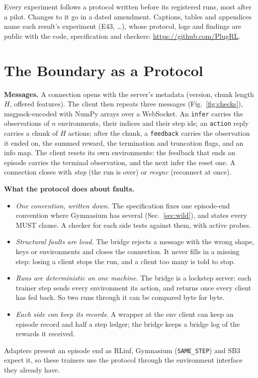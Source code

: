 \documentclass[conference]{IEEEtran}
\newcommand{\msg}[1]{\texttt{#1}}
\begin{document}
Every experiment follows a protocol written before its registered runs,
most after a pilot. Changes to it go in a dated amendment. Captions,
tables and appendices name each result's experiment (E43, \ldots), whose
protocol, logs and findings are public with the code, specification and
checkers: \url{https://github.com/PlugRL}.

\section{The Boundary as a Protocol}
\label{sec:protocol}

\textbf{Messages.} A connection opens with the server's metadata (version,
chunk length $H$, offered features). The client then repeats three messages
(Fig.~\ref{fig:checks}), msgpack-encoded with NumPy arrays over a
WebSocket. An \msg{infer} carries the observations of $n$ environments,
their indices and their step ids; an \msg{action} reply carries a chunk of
$H$ actions; after the chunk, a \msg{feedback} carries the observation it
ended on, the summed reward, the termination and truncation flags, and an
info map. The client resets its own environments: the feedback that ends an
episode carries the terminal observation, and the next infer the reset one.
A connection closes with \emph{stop} (the run is over) or \emph{resync}
(reconnect at once).

\textbf{What the protocol does about faults.}
\begin{itemize}
\item \emph{One convention, written down.} The specification fixes one
  episode-end convention where Gymnasium has several (Sec.~\ref{sec:wild}),
  and states every MUST clause. A checker for each side tests against
  them, with active probes.
\item \emph{Structural faults are loud.} The bridge rejects a message with
  the wrong shape, keys or environments and closes the connection. It never
  fills in a missing step: losing a client stops the run, and a client too
  many is told to stop.
\item \emph{Runs are deterministic on one machine.} The bridge is a lockstep
  server: each trainer step sends every environment its action, and returns
  once every client has fed back. So two runs through it can be compared
  byte for byte.
\item \emph{Each side can keep its records.} A wrapper at the env client
  can keep an episode record and half a step ledger; the bridge keeps a bridge
  log of the rewards it received.
\end{itemize}
Adapters present an episode end as RLinf, Gymnasium (\texttt{SAME\_STEP})
and SB3 expect it, so these trainers use the protocol through the
environment interface they already have.
\end{document}
